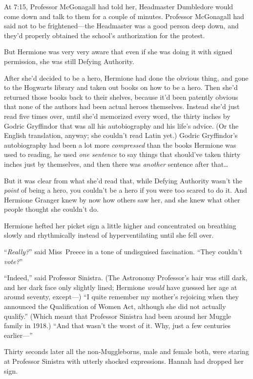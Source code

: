 At 7:15\PM, Professor McGonagall had told her, Headmaster Dumbledore would come down and talk to them for a couple of minutes. Professor McGonagall had said not to be frightened—the Headmaster was a good person deep down, and they’d properly obtained the school’s authorization for the protest.

But Hermione was very very aware that even if she was doing it with signed permission, she was still Defying Authority.

After she’d decided to be a hero, Hermione had done the obvious thing, and gone to the Hogwarts library and taken out books on how to be a hero. Then she’d returned those books back to their shelves, because it’d been patently obvious that none of the authors had been actual heroes themselves. Instead she’d just read five times over, until she’d memorized every word, the thirty inches by Godric Gryffindor that was all his autobiography and his life’s advice. (Or the English translation, anyway; she couldn’t read Latin yet.) Godric Gryffindor’s autobiography had been a lot more \emph{compressed} than the books Hermione was used to reading, he used \emph{one sentence} to say things that should’ve taken thirty inches just by themselves, and then there was \emph{another} sentence after that…

But it was clear from what she’d read that, while Defying Authority wasn’t the \emph{point} of being a hero, you couldn’t be a hero if you were too scared to do it. And Hermione Granger knew by now how others saw her, and she knew what other people thought she couldn’t do.

Hermione hefted her picket sign a little higher and concentrated on breathing slowly and rhythmically instead of hyperventilating until she fell over.

“\emph{Really?}” said Miss~Preece in a tone of undisguised fascination. “They couldn’t \emph{vote?}”

“Indeed,” said Professor Sinistra. (The Astronomy Professor’s hair was still dark, and her dark face only slightly lined; Hermione \emph{would} have guessed her age at around seventy, except—) “I quite remember my mother’s rejoicing when they announced the Qualification of Women Act, although she did not actually qualify.” (Which meant that Professor Sinistra had been around her Muggle family in 1918.) “And that wasn’t the worst of it. Why, just a few centuries earlier—”

Thirty seconds later all the non-Muggleborns, male and female both, were staring at Professor Sinistra with utterly shocked expressions. Hannah had dropped her sign.

